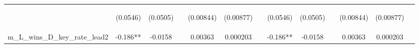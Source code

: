 \documentclass[]{article}
\begin{document}
\begin{center}
\begin{tabular}{lcccccccccccc}
\vspace{4pt} & \begin{footnotesize}(0.0546)\end{footnotesize} & \begin{footnotesize}(0.0505)\end{footnotesize} & \begin{footnotesize}\end{footnotesize} & \begin{footnotesize}(0.00844)\end{footnotesize} & \begin{footnotesize}(0.00877)\end{footnotesize} & \begin{footnotesize}\end{footnotesize} & \begin{footnotesize}(0.0546)\end{footnotesize} & \begin{footnotesize}(0.0505)\end{footnotesize} & \begin{footnotesize}\end{footnotesize} & \begin{footnotesize}(0.00844)\end{footnotesize} & \begin{footnotesize}(0.00877)\end{footnotesize} & \begin{footnotesize}\end{footnotesize} \\
m\_L\_wins\_D\_key\_rate\_lead2 & -0.186** & -0.0158 &  & 0.00363 & 0.000203 &  & -0.186** & -0.0158 &  & 0.00363 & 0.000203 &  \\

\end{tabular}
\end{center}
\end{document}
